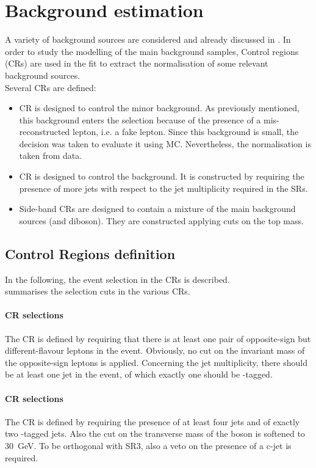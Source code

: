 \clearpage
\section{Background estimation}
\label{sec:background_all}
A variety of background sources are considered and already discussed in .
In order to study the modelling of the main background samples, Control regions (CRs) are used in the fit to extract the normalisation of some relevant background sources.\\
Several CRs are defined:
\begin{itemize}
	\item \ttbar CR is designed to control the minor \ttbar
	background. As previously mentioned, this background enters the
	selection because of the presence of a mis-reconstructed lepton,
	i.e. a fake lepton. Since this background is small, the decision was
	taken to evaluate it using MC. Nevertheless, the normalisation is
	taken from data. 
	\item \ttZ CR is designed to control the \ttZ
	background. It is constructed by requiring the presence of more jets
	with respect to the jet multiplicity required in the SRs.
	\item Side-band CRs are designed to contain a mixture
	of the main background sources (\ttZ and diboson). They are
	constructed applying cuts on the top mass.
\end{itemize}

\subsection {Control Regions definition}
\label{sec:bkg:sel}
In the following, the event selection in the CRs is described.\\
 summarises the selection cuts in the various CRs.
\paragraph{\ttbar CR selections}
The \ttbar CR is defined by requiring that there is at least one pair
of opposite-sign but different-flavour leptons in the
event. Obviously, no cut on the invariant mass of the opposite-sign
leptons is applied. Concerning the jet multiplicity, there should be
at least one jet in the event, of which exactly one should be
\Pqb-tagged.

\paragraph{\ttZ CR selections}
\label{sec:bkg:ttz}
The \ttZ CR is defined by requiring the presence of at least four jets
and of exactly two \Pqb-tagged jets. Also the cut on the transverse
mass of the \PW boson is softened to \SI{30}{\GeV}. To be orthogonal 
with SR3, also a veto on the presence of a c-jet is required. 

